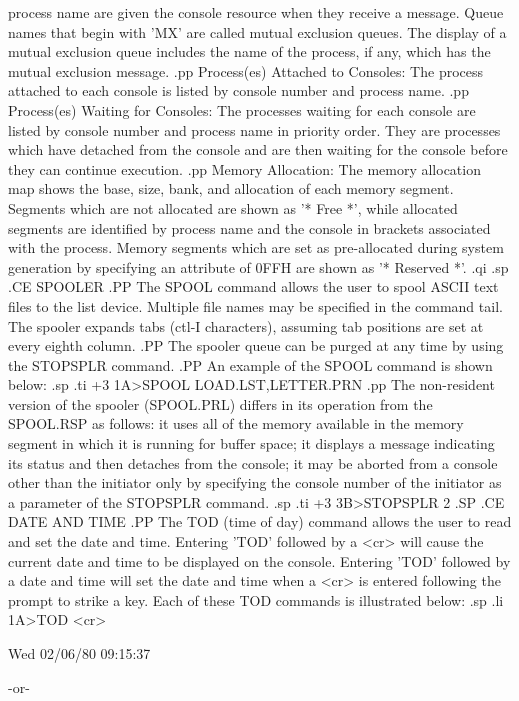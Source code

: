 process name are given the console resource when they receive a
message.
Queue names that begin with 'MX' are called mutual exclusion queues.
The display of a mutual exclusion queue includes the name of the process,
if any, which has the mutual exclusion message.
.pp
Process(es) Attached to Consoles:  The process attached to each console
is listed by console number and process name.
.pp
Process(es) Waiting for Consoles:  The processes waiting for each
console are listed by console number and process name in priority
order.  They are processes
which have detached from the console and are then waiting for the
console before they can continue execution.
.pp
Memory Allocation:  The memory allocation map shows the base, size, bank,
and allocation of each memory segment.  Segments which are not
allocated are shown as '* Free *', while allocated segments are
identified by process name and the console in brackets associated with
the process.
Memory segments which are set as pre-allocated during system generation
by specifying an attribute of 0FFH are shown as '* Reserved *'.
.qi
.sp
.CE
SPOOLER
.PP
The SPOOL command allows the user to spool ASCII text files to the
list device.  Multiple file names may be specified in the command
tail.  The spooler expands tabs (ctl-I characters), assuming tab
positions are set at every eighth column.
.PP
The spooler queue can be purged at any time by using the STOPSPLR
command.
.PP
An example of the SPOOL command is shown below:
.sp
.ti +3
1A>SPOOL LOAD.LST,LETTER.PRN
.pp
The non-resident version of the spooler (SPOOL.PRL) differs
in its operation from the SPOOL.RSP as follows: it uses all
of  the memory available in the memory segment in which  it
is  running  for  buffer  space;   it  displays  a  message
indicating  its status and then detaches from the  console;
it  may be aborted from a console other than the  initiator
only by specifying the console number of the initiator as a
parameter of the STOPSPLR command.
.sp
.ti +3
3B>STOPSPLR 2
.SP
.CE
DATE AND TIME
.PP
The TOD (time of day) command allows the user to read and set the
date and time.  Entering 'TOD' followed by a <cr> will cause the
current date and time to be displayed on the console. Entering
'TOD' followed by a date and time will set the date and time
when a <cr> is entered following the prompt to strike a key.
Each of these TOD commands is illustrated below:
.sp
.li
   1A>TOD <cr>

   Wed 02/06/80 09:15:37

   -or-

